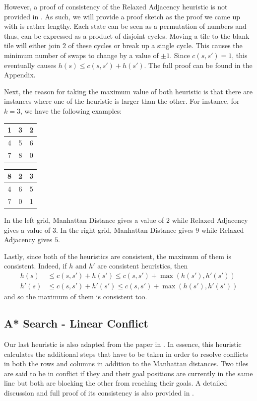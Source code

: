 \documentclass[runningheads]{llncs}
\begin{document}
However, a proof of consistency of the Relaxed Adjacency heuristic is not provided in \cite{ref_2}. As such, we will provide a proof sketch as the proof we came up with is rather lengthy. Each state can be seen as a permutation of numbers and thus, can be expressed as a product of disjoint cycles. Moving a tile to the blank tile will either join $2$ of these cycles or break up a single cycle. This causes the minimum number of swaps to change by a value of $\pm 1$. Since $c(s, s') = 1$, this eventually causes $h(s) \leq c(s, s') + h(s')$. The full proof can be found in the Appendix.

Next, the reason for taking the maximum value of both heuristic is that there are instances where one of the heuristic is larger than the other. For instance, for $k = 3$, we have the following examples:
\begin{center}
    \begin{tabular}{| c | c | c |}
        \hline
        1 & 3 & 2 \\
        \hline
        4 & 5 & 6 \\
        \hline
        7 & 8 & 0 \\
        \hline
    \end{tabular}
    \quad
    \begin{tabular}{| c | c | c |}
        \hline
        8 & 2 & 3 \\
        \hline
        4 & 6 & 5 \\
        \hline
        7 & 0 & 1 \\
        \hline
    \end{tabular}
\end{center}

In the left grid, Manhattan Distance gives a value of $2$ while Relaxed Adjacency gives a value of $3$. In the right grid, Manhattan Distance gives $9$ while Relaxed Adjacency gives $5$.

Lastly, since both of the heuristics are consistent, the maximum of them is consistent. Indeed, if $h$ and $h'$ are consistent heuristics, then
\begin{align*}
    h(s) & \leq c(s, s') + h(s') \leq c(s, s') + \max (h(s'), h'(s'))\\
    h'(s) & \leq c(s, s') + h'(s') \leq c(s, s') + \max (h(s'), h'(s')) 
\end{align*}
and so the maximum of them is consistent too.

\subsection{A* Search - Linear Conflict}
Our last heuristic is also adapted from the paper in \cite{ref_2}. In essence, this heuristic calculates the additional steps that have to be taken in order to resolve conflicts in both the rows and columns in addition to the Manhattan distances. Two tiles are said to be in conflict if they and their goal positions are currently in the same line but both are blocking the other from reaching their goals. A detailed discussion and full proof of its consistency is also provided in \cite{ref_2}.
\end{document}
